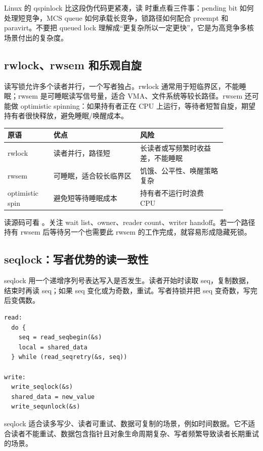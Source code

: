 Linux 的 qspinlock 比这段伪代码更紧凑，读  时重点看三件事：pending bit 如何处理短竞争，MCS queue 如何承载长竞争，锁路径如何配合 preempt 和 paravirt。不要把 queued lock 理解成“更复杂所以一定更快”，它是为高竞争多核场景付出的复杂度。

\subsection{rwlock、rwsem 和乐观自旋}

读写锁允许多个读者并行，一个写者独占。rwlock 通常用于短临界区，不能睡眠；rwsem 是可睡眠读写信号量，适合 VMA、文件系统等较长路径。rwsem 还可能做 optimistic spinning：如果持有者正在 CPU 上运行，等待者短暂自旋，期望持有者很快释放，避免睡眠/唤醒成本。

\begin{longtable}{|p{0.18\linewidth}|p{0.34\linewidth}|p{0.34\linewidth}|}
\toprule
原语 & 优点 & 风险 \\
\midrule
rwlock & 读者并行，路径短 & 长读者或写频繁时收益差，不能睡眠 \\\tablerowrule
rwsem & 可睡眠，适合较长临界区 & 饥饿、公平性、唤醒策略复杂 \\\tablerowrule
optimistic spin & 避免短等待睡眠成本 & 持有者不运行时浪费 CPU \\
\bottomrule
\end{longtable}

读源码可看 。关注 wait list、owner、reader count、writer handoff。若一个路径持有 rwsem 后等待另一个也需要此 rwsem 的工作完成，就容易形成隐藏死锁。

\subsection{seqlock：写者优势的读一致性}

seqlock 用一个递增序列号表达写入是否发生。读者开始时读取 seq，复制数据，结束时再读 seq；如果 seq 变化或为奇数，重试。写者持锁并把 seq 变奇数，写完后变偶数。

\begin{lstlisting}
read:
  do {
    seq = read_seqbegin(&s)
    local = shared_data
  } while (read_seqretry(&s, seq))

write:
  write_seqlock(&s)
  shared_data = new_value
  write_sequnlock(&s)
\end{lstlisting}

seqlock 适合读多写少、读者可重试、数据可复制的场景，例如时间数据。它不适合读者不能重试、数据包含指针且对象生命周期复杂、写者频繁导致读者长期重试的场景。

